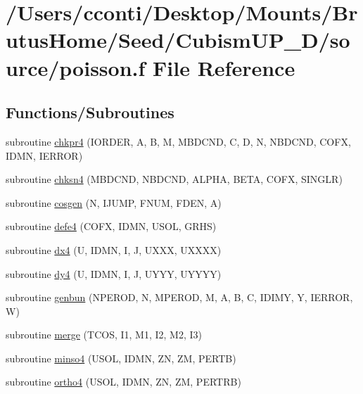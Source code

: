 \hypertarget{poisson_8f}{}\section{/\+Users/cconti/\+Desktop/\+Mounts/\+Brutus\+Home/\+Seed/\+Cubism\+U\+P\+\_\+D/source/poisson.f File Reference}
\label{poisson_8f}
\subsection*{Functions/\+Subroutines}
\begin{DoxyCompactItemize}
\item 
subroutine \hyperlink{poisson_8f_a82f42c45b2e6677f11e94429b26e1663}{chkpr4} (I\+O\+R\+D\+E\+R, A, B, M, M\+B\+D\+C\+N\+D, C, D, N, N\+B\+D\+C\+N\+D, C\+O\+F\+X, I\+D\+M\+N, I\+E\+R\+R\+O\+R)
\item 
subroutine \hyperlink{poisson_8f_a2ddc05f3ab4714b20a9d185411ae1ac8}{chksn4} (M\+B\+D\+C\+N\+D, N\+B\+D\+C\+N\+D, A\+L\+P\+H\+A, B\+E\+T\+A, C\+O\+F\+X, S\+I\+N\+G\+L\+R)
\item 
subroutine \hyperlink{poisson_8f_aef77c4415ca0759b213e0c9f88223ab3}{cosgen} (N, I\+J\+U\+M\+P, F\+N\+U\+M, F\+D\+E\+N, A)
\item 
subroutine \hyperlink{poisson_8f_a355d5a5f4d4f6d5d3949cb08dce619ef}{defe4} (C\+O\+F\+X, I\+D\+M\+N, U\+S\+O\+L, G\+R\+H\+S)
\item 
subroutine \hyperlink{poisson_8f_a83808063c1fdd679d4b026ba63bd926d}{dx4} (U, I\+D\+M\+N, I, J, U\+X\+X\+X, U\+X\+X\+X\+X)
\item 
subroutine \hyperlink{poisson_8f_a61a13ff9c3d8b209f2d82002f7d95620}{dy4} (U, I\+D\+M\+N, I, J, U\+Y\+Y\+Y, U\+Y\+Y\+Y\+Y)
\item 
subroutine \hyperlink{poisson_8f_ad1505c36f22eafeef816abf4e9e81554}{genbun} (N\+P\+E\+R\+O\+D, N, M\+P\+E\+R\+O\+D, M, A, B, C, I\+D\+I\+M\+Y, Y, I\+E\+R\+R\+O\+R, W)
\item 
subroutine \hyperlink{poisson_8f_a231b7bb127bbc680c262deff2cfb3aee}{merge} (T\+C\+O\+S, I1, M1, I2, M2, I3)
\item 
subroutine \hyperlink{poisson_8f_a691b584433e3b4a9f083c04664d38ce7}{minso4} (U\+S\+O\+L, I\+D\+M\+N, Z\+N, Z\+M, P\+E\+R\+T\+B)
\item 
subroutine \hyperlink{poisson_8f_a1ac1a469b1d6fa84bbdc9a8743706153}{ortho4} (U\+S\+O\+L, I\+D\+M\+N, Z\+N, Z\+M, P\+E\+R\+T\+R\+B)

\end{DoxyCompactItemize}
